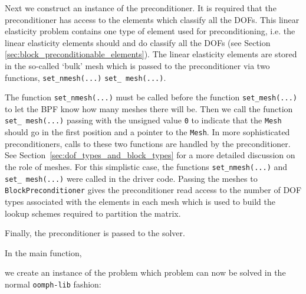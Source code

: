 Next we construct an instance of the preconditioner. It is required that the preconditioner has
access to the elements which classify all the DOFs. This linear elasticity
problem contains one type of element used for preconditioning, i.e. the linear
elasticity elements should and do classify all the DOFs (see Section
\ref{sec:block_preconditionable_elements}). The linear elasticity elements are
stored in the so-called `bulk' mesh which is passed to the preconditioner via
two functions, \texttt{set\_\allowbreak nmesh(...)} \texttt{set\_\allowbreak
  mesh(...)}. 
\lstset{numberstyle=\scriptsize,breaklines=true, numbers=left, stepnumber=2, frame=single,basicstyle=\ttfamily\scriptsize, showstringspaces=false, language=C++}

The function \texttt{set\_\allowbreak nmesh(...)} must be called before the
function \texttt{set\_\allowbreak mesh(...)} to let the BPF know how many
meshes there will be. Then we call the function \texttt{set\_\allowbreak
  mesh(...)} passing with the unsigned value \texttt{0} to indicate that the
\texttt{Mesh} should go in the first position and a pointer to the
\texttt{Mesh}. In more sophisticated preconditioners, calls to these two functions are handled by the preconditioner. See Section~\ref{sec:dof_types_and_block_types} for a more detailed discussion on the role of meshes. For this simplistic case, the
functions \texttt{set\_\allowbreak nmesh(...)} and \texttt{set\_\allowbreak
  mesh(...)} were called in the driver code. Passing the meshes to
\texttt{Block\allowbreak Preconditioner} gives the preconditioner read access
to the number of DOF types associated with the elements in each mesh which is
used to build the lookup schemes required to partition the matrix.

Finally, the preconditioner is passed to the solver.


In the main function,
\lstset{numberstyle=\scriptsize,breaklines=true, numbers=left, stepnumber=2, frame=single,basicstyle=\ttfamily\scriptsize, showstringspaces=false, language=C++}

we create an instance of the  problem which problem can now be solved in the
normal \texttt{oomph-\allowbreak lib} fashion:
\lstset{numberstyle=\scriptsize,breaklines=true, numbers=left, stepnumber=2, frame=single,basicstyle=\ttfamily\scriptsize, showstringspaces=false, language=C++}


